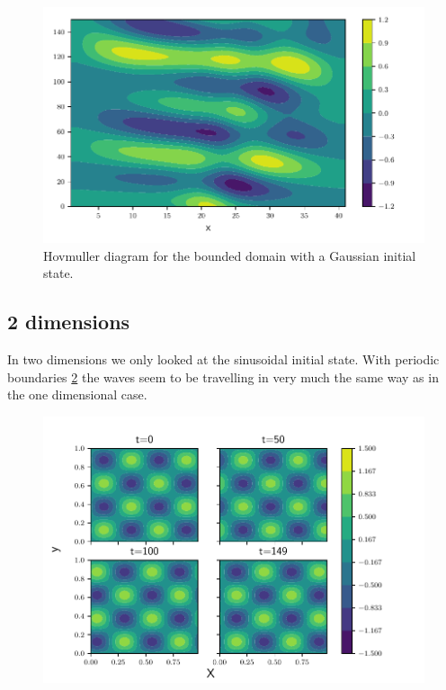 \begin{figure}[htp]
  \centering
  \includegraphics[width=\textwidth]{../figures/psi_bounded_centered_gauss.pdf}
  \caption{Hovmuller diagram for the bounded domain with a Gaussian initial
  state.}
  \label{fig:bounded_gauss}
\end{figure}


\subsection{2 dimensions}

In two dimensions we only looked at the sinusoidal initial state.
With periodic boundaries \cref{fig:2d_periodic} the waves seem to be travelling
in very much the same way as in the one dimensional case.


\begin{figure}[htp]
  \centering
  \includegraphics[width=\textwidth]{../figures/periodic_2d.pdf}
  \caption{}
  \label{fig:2d_periodic}
\end{figure}



